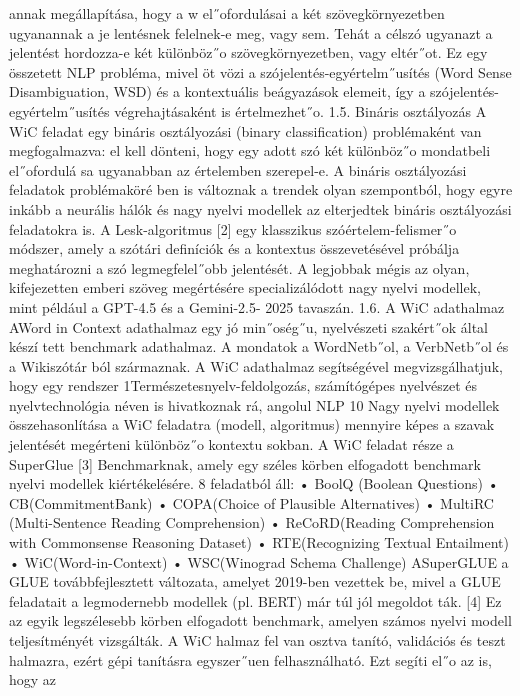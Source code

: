 \documentclass[12pt]{report}
\theoremstyle{definition}
\begin{document}
 annak megállapítása, hogy a w el˝ofordulásai a két szövegkörnyezetben ugyanannak a je
lentésnek felelnek-e meg, vagy sem. Tehát a célszó ugyanazt a jelentést hordozza-e két
 különböz˝o szövegkörnyezetben, vagy eltér˝ot. Ez egy összetett NLP probléma, mivel öt
vözi a szójelentés-egyértelm˝usítés (Word Sense Disambiguation, WSD) és a kontextuális
 beágyazások elemeit, így a szójelentés-egyértelm˝usítés végrehajtásaként is értelmezhet˝o.
 1.5. Bináris osztályozás
 A WiC feladat egy bináris osztályozási (binary classification) problémaként van
 megfogalmazva: el kell dönteni, hogy egy adott szó két különböz˝o mondatbeli el˝ofordulá
sa ugyanabban az értelemben szerepel-e. A bináris osztályozási feladatok problémaköré
ben is változnak a trendek olyan szempontból, hogy egyre inkább a neurális hálók és nagy
 nyelvi modellek az elterjedtek bináris osztályozási feladatokra is. A Lesk-algoritmus [2]
 egy klasszikus szóértelem-felismer˝o módszer, amely a szótári definíciók és a kontextus
 összevetésével próbálja meghatározni a szó legmegfelel˝obb jelentését. A legjobbak mégis
 az olyan, kifejezetten emberi szöveg megértésére specializálódott nagy nyelvi modellek,
 mint például a GPT-4.5 és a Gemini-2.5- 2025 tavaszán.
 1.6. A WiC adathalmaz
 AWord in Context adathalmaz egy jó min˝oség˝u, nyelvészeti szakért˝ok által készí
tett benchmark adathalmaz. A mondatok a WordNetb˝ol, a VerbNetb˝ol és a Wikiszótár
ból származnak. A WiC adathalmaz segítségével megvizsgálhatjuk, hogy egy rendszer
 1Természetesnyelv-feldolgozás, számítógépes nyelvészet és nyelvtechnológia néven is hivatkoznak rá,
 angolul NLP
 10
Nagy nyelvi modellek összehasonlítása a WiC feladatra
 (modell, algoritmus) mennyire képes a szavak jelentését megérteni különböz˝o kontextu
sokban. A WiC feladat része a SuperGlue [3] Benchmarknak, amely egy széles körben
 elfogadott benchmark nyelvi modellek kiértékelésére. 8 feladatból áll:
 • BoolQ (Boolean Questions)
 • CB(CommitmentBank)
 • COPA(Choice of Plausible Alternatives)
 • MultiRC (Multi-Sentence Reading Comprehension)
 • ReCoRD(Reading Comprehension with Commonsense Reasoning Dataset)
 • RTE(Recognizing Textual Entailment)
 • WiC(Word-in-Context)
 • WSC(Winograd Schema Challenge)
 ASuperGLUE a GLUE továbbfejlesztett változata, amelyet 2019-ben vezettek be,
 mivel a GLUE feladatait a legmodernebb modellek (pl. BERT) már túl jól megoldot
ták. [4] Ez az egyik legszélesebb körben elfogadott benchmark, amelyen számos nyelvi
 modell teljesítményét vizsgálták. A WiC halmaz fel van osztva tanító, validációs és teszt
halmazra, ezért gépi tanításra egyszer˝uen felhasználható. Ezt segíti el˝o az is, hogy az
\end{document}
